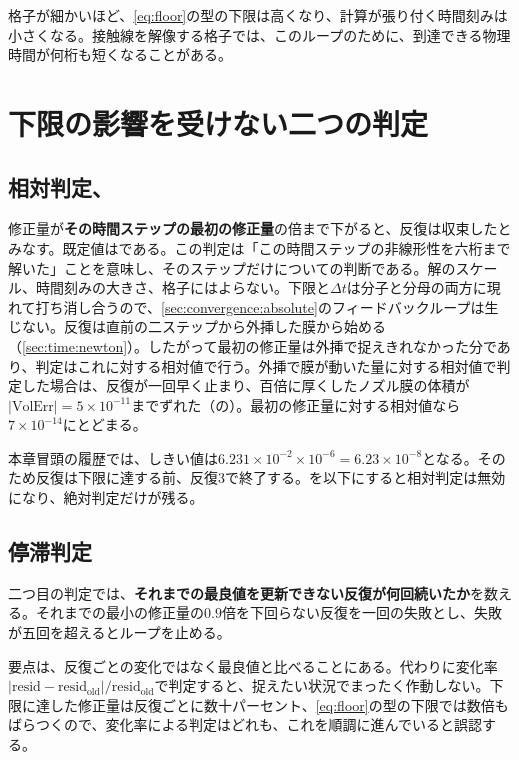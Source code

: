 格子が細かいほど、\cref{eq:floor}の型の下限は高くなり、計算が張り付く時間刻みは小さくなる。接触線を解像する格子では、このループのために、到達できる物理時間が何桁も短くなることがある。

\section{下限の影響を受けない二つの判定}
\label{sec:convergence:tests}

\subsection{相対判定、}

修正量が\textbf{その時間ステップの最初の修正量}の倍まで下がると、反復は収束したとみなす。既定値はである。この判定は「この時間ステップの非線形性を六桁まで解いた」ことを意味し、そのステップだけについての判断である。解のスケール、時間刻みの大きさ、格子にはよらない。下限と$\Delta t$は分子と分母の両方に現れて打ち消し合うので、\cref{sec:convergence:absolute}のフィードバックループは生じない。反復は直前の二ステップから外挿した膜から始める（\cref{sec:time:newton}）。したがって最初の修正量は外挿で捉えきれなかった分であり、判定はこれに対する相対値で行う。外挿で膜が動いた量に対する相対値で判定した場合は、反復が一回早く止まり、百倍に厚くしたノズル膜の体積が$|\mathrm{VolErr}| = 5\times10^{-11}$までずれた（の）。最初の修正量に対する相対値なら$7\times10^{-14}$にとどまる。

本章冒頭の履歴では、しきい値は$6.231\times10^{-2} \times 10^{-6} = 6.23\times10^{-8}$となる。そのため反復は下限に達する前、反復3で終了する。を以下にすると相対判定は無効になり、絶対判定だけが残る。

\subsection{停滞判定}
\label{sec:convergence:stagnation}

二つ目の判定では、\textbf{それまでの最良値を更新できない反復が何回続いたか}を数える。それまでの最小の修正量の$0.9$倍を下回らない反復を一回の失敗とし、失敗が五回を超えるとループを止める。

要点は、反復ごとの変化ではなく最良値と比べることにある。代わりに変化率$\lvert\mathrm{resid} - \mathrm{resid_{old}}\rvert/\mathrm{resid_{old}}$で判定すると、捉えたい状況でまったく作動しない。下限に達した修正量は反復ごとに数十パーセント、\cref{eq:floor}の型の下限では数倍もばらつくので、変化率による判定はどれも、これを順調に進んでいると誤認する。

